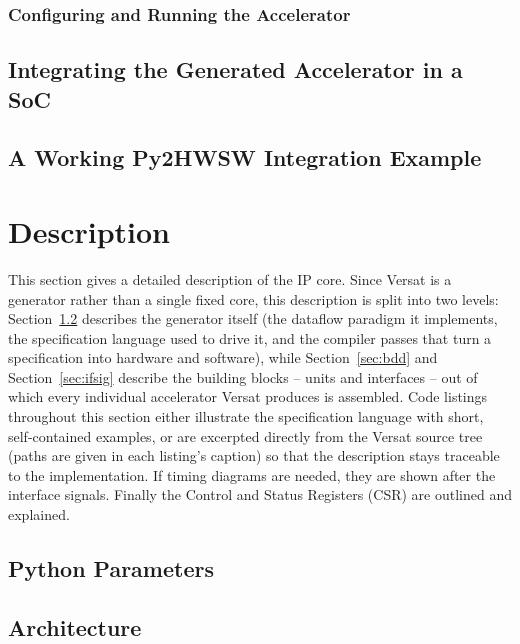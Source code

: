 \documentclass{ug}
\begin{document}
\subsubsection{Configuring and Running the Accelerator}
\label{sec:simple_example_software}


\subsection{Integrating the Generated Accelerator in a SoC}
\label{sec:soc_integration}


\subsection{A Working Py2HWSW Integration Example}
\label{sec:py2hwsw_example}


\ifdefined\SECTIONCLEARPAGE
\clearpage
\fi
\section{Description}

This section gives a detailed description of the IP core. Since Versat is a
generator rather than a single fixed core, this description is split into
two levels: Section~\ref{sec:architecture} describes the generator itself
(the dataflow paradigm it implements, the specification language used to
drive it, and the compiler passes that turn a specification into hardware
and software), while Section~\ref{sec:bdd} and Section~\ref{sec:ifsig}
describe the building blocks -- units and interfaces -- out of which every
individual accelerator Versat produces is assembled. Code listings
throughout this section either illustrate the specification language with
short, self-contained examples, or are excerpted directly from the Versat
source tree (paths are given in each listing's caption) so that the
description stays traceable to the implementation. If timing diagrams are
needed, they are shown after the interface signals. Finally the Control and
Status Registers (CSR) are outlined and explained.


\ifdefined\PYPARAMS
\subsection{Python Parameters}
\label{sec:py_params}

\fi

\subsection{Architecture}
\label{sec:architecture}
\end{document}
